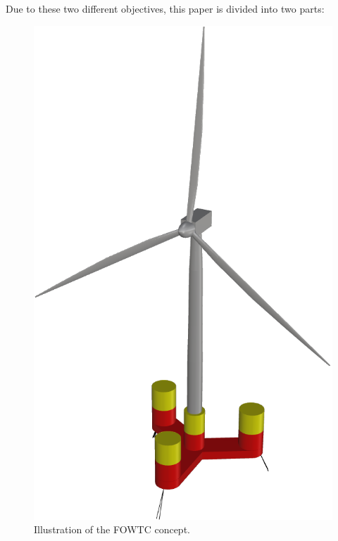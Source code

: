 Due to these two different objectives, this paper is divided into two parts:
\begin{figure}[!hbtp]
	\centering
	\includegraphics[scale=0.30]{./figures/Perspectiva_semfundo.png}
	\caption{Illustration of the FOWTC concept.} \label{fig:intro:fowtc}
\end{figure}

